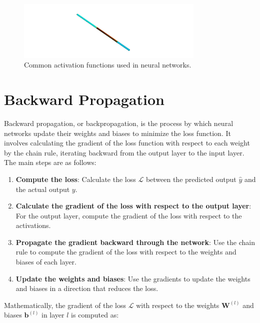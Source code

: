 \documentclass{report}
\begin{document}
        \begin{figure}[h]
            \centering
            \includegraphics[width=0.8\textwidth]{00_Images/00_Velocity.png}
            \caption{Common activation functions used in neural networks.}
            \label{fig:activation_functions}
        \end{figure}
    
        \section{Backward Propagation}

            Backward propagation, or backpropagation, is the process by which neural networks update their weights and biases to minimize the loss function. It involves calculating the gradient of the loss function with respect to each weight by the chain rule, iterating backward from the output layer to the input layer. The main steps are as follows:
            
            \begin{enumerate}
                \item \textbf{Compute the loss}: Calculate the loss \( \mathcal{L} \) between the predicted output \( \hat{y} \) and the actual output \( y \).
                \item \textbf{Calculate the gradient of the loss with respect to the output layer}: For the output layer, compute the gradient of the loss with respect to the activations.
                \item \textbf{Propagate the gradient backward through the network}: Use the chain rule to compute the gradient of the loss with respect to the weights and biases of each layer.
                \item \textbf{Update the weights and biases}: Use the gradients to update the weights and biases in a direction that reduces the loss.
            \end{enumerate}
            
            Mathematically, the gradient of the loss \( \mathcal{L} \) with respect to the weights \( \mathbf{W}^{(l)} \) and biases \( \mathbf{b}^{(l)} \) in layer \( l \) is computed as:
            
\end{document}
